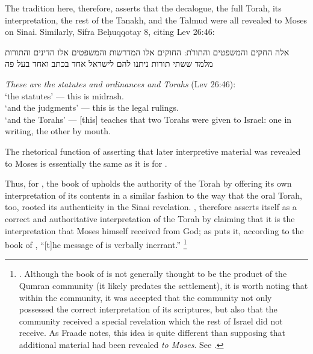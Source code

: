 \noindent
The tradition here, therefore, asserts that the decalogue, the full Torah, its interpretation, the rest of the Tanakh, and the Talmud were all revealed to Moses on Sinai. Similarly, Sifra Beḥuqqotay 8, citing Lev 26:46:
\begin{aramaictranslation}
    אלה החקים והמשפטים והתורֹת: החוקים אלו המדרשות והמשפטים אלו הדינים והתורות מלמד ששתי תורות ניתנו להם לישראל אחד בכתב ואחד בעל פה
\end{aramaictranslation}
\begin{translation}
    \emph{These are the statutes and ordinances and Torahs} (Lev 26:46):\\
    \-\hspace{2em} `the statutes' --- this is midrash.\\
    \-\hspace{2em} `and the judgments' --- this is the legal rulings.\\
    \-\hspace{2em} `and the Torahs' --- [this] teaches that two Torahs were given to Israel: one in writing, the other by mouth.
\end{translation}
\noindent

The rhetorical function of asserting that later interpretive material was revealed to Moses is essentially the same as it is for \jub.

Thus, for \vanderkam, the book of \jub upholds the authority of the Torah by offering its own interpretation of its contents in a similar fashion to the way that the oral Torah, too, rooted its authenticity in the Sinai revelation. \jub, therefore asserts itself as a correct and authoritative interpretation of the Torah by claiming that it is the interpretation that Moses himself received from God; as \vanderkam puts it, according to the book of \jub, ``[t]he message of \jub is verbally inerrant.''%
    \footnote{
        \cite[33]{vanderkam_metso-etal2010}.
        Although the book of \jub is not generally thought to be the product of the Qumran community (it likely predates the settlement), it is worth noting that within the community, it was accepted that the community not only possessed the correct interpretation of its scriptures, but also that the community received a special revelation which the rest of Israel did not receive. As Fraade notes, this idea is quite different than supposing that additional material had been revealed \emph{to Moses}. See 
        \cite[67]{fraade_jjs1993}.}

